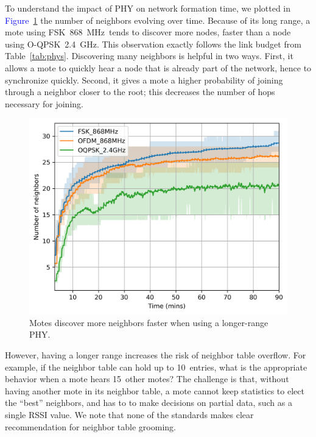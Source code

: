 \documentclass[sensors,article,submit,moreauthors,pdftex]{Definitions/mdpi}
\newcommand{\fsk}           {FSK~868~MHz}
\newcommand{\oqpsk}         {O-QPSK~2.4~GHz}
\newcommand{\figwidth}      {0.78}
\newcommand{\update}[1]     {\textcolor{blue}{#1}}
\begin{document}

To understand the impact of PHY on network formation time, we plotted in \update{Figure}~\ref{fig:neighbors_time} the number of neighbors evolving over time.
Because of its long range, a mote using \fsk\ tends to discover more nodes, faster than a node using \oqpsk.
This observation exactly follows the link budget from Table~\ref{tab:phys}.
Discovering many neighbors is helpful in two ways.
First, it allows a mote to quickly hear a node that is already part of the network,
    hence to synchronize quickly.
Second, it gives a mote a higher probability of joining through a neighbor closer to the root; this decreases the number of hops necessary for joining.

\begin{figure}[ht]
	\centering
	\includegraphics[width=\figwidth\columnwidth]{neighbors_time}
    \caption{Motes discover more neighbors faster when using a longer-range PHY.}
    \label{fig:neighbors_time}
\end{figure}


However, having a longer range increases the risk of neighbor table overflow.
For example, if the neighbor table can hold up to 10~entries, what is the appropriate behavior when a mote  hears 15~other motes?
The challenge is that, without having another mote in its neighbor table, a mote cannot keep statistics to elect the ``best'' neighbors, and has to to make decisions on partial data, such as a single RSSI value.
We note that none of the standards makes clear recommendation for neighbor table grooming.
\end{document}
